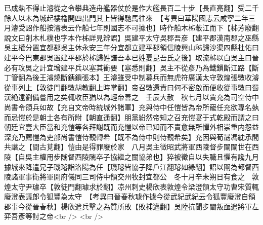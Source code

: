已成埶不得止濬從之令攀典造舟艦器仗於是作大艦長百二十步【長直亮翻】受二千餘人以木為城起樓櫓開四出門其上皆得馳馬往來　【考異曰華陽國志云咸寧二年三月濬受詔作船按濬表云作船七年則國志不可據也】時作船木柹蔽江而下【柹芳廢翻說文曰削木札樸也字本作柹詳見辨誤】吳建平太守吳郡吾彦【建平郡漢南郡之巫縣吳主權分置宜都郡吳主休永安三年分宜都立建平郡領信陵興山秭歸沙渠四縣杜佑曰建平今巴東郡吳置建平郡於柹歸姓譜吾本已姓夏昆吾氏之後】取流柹以白吳主曰晉必有攻吳之計宜增建平兵以塞其衝要【塞悉則翻】吳主不從彥乃為鐵鎻斷江路【斷丁管翻為後王濬燒斷銕鎻張本】王濬雖受中制募兵而無虎符廣漢太守敦煌張斆收濬從事列上【敦徒門翻斆胡教翻上時掌翻】帝召斆還責曰何不密啟而便收從事斆曰蜀漢絶遠劉備嘗用之矣輒收臣猶以為輕帝善之　壬辰大赦　秋七月以賈充為司空侍中尚書令領兵如故【充自文帝時統城外諸軍】充與侍中任愷皆為帝所寵任充欲專名埶而忌愷於是朝士各有所附【朝直遥翻】朋黨紛然帝知之召充愷宴于式乾殿而謂之曰朝廷宜壹大臣當和充愷等各拜謝既而充愷以帝已知而不責愈無所憚外相崇重内怨益深充乃薦愷為吏部尚書愷侍覲轉希【既不為侍中則侍覲希矣】充因與荀勗馮紞承間共譖之【間古莧翻】愷由是得罪廢於家　八月吳主徵昭武將軍西陵督步闡闡世在西陵【自吳主權用步隲督西陵隲卒子協繼之關協弟也】猝被徵自以失職且懼有讒九月據城來降遣兄子璣璿詣洛陽為任【璣璿皆協子降戶江翻璿如緣翻】詔以闡為都督西陵諸軍事衛將軍開府儀同三司侍中領交州牧封宜都公　冬十月辛未朔日有食之　敦煌太守尹璩卒【敦徒門翻璩求於翻】凉州刺史楊欣表敦煌令梁澄領太守功曹宋質輒廢澄表議郎令狐豐為太守　【考異曰晉春秋璩作據今從武紀武紀云令狐豐廢澄自領郡事今從晉春秋】楊欣遣兵擊之為質所敗【敗補邁翻】吳陸抗聞步闡叛亟遣將軍左弈吾彥等討之帝<br />
<br />
